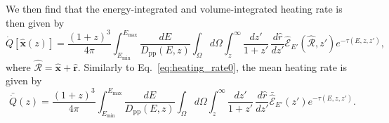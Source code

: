 \documentclass[numberedappendix]{emulateapj}
\begin{document}
We then find that the energy-integrated and volume-integrated heating rate is then given by 
\begin{equation}
  \label{eq:int_exp_heat}
  \dot{Q}[\mathbf{\hat{x}}(z)]=\frac{(1+z)^3}{4\pi }\int_{E_{\mathrm{min}}}^{E_{\mathrm{max}}} \frac{dE}{D_{\mathrm{pp}}(E,z)}\int_{\Omega}d\Omega\int_z^{\infty} \frac{d z'}{1+z'}\,\frac{d\hat r}{dz'}\mathcal{\hat E}_{E'}(\mathbf{\hat{\mathcal{R}}}, z') e^{-\tau(E,z,z')},
\end{equation}
where $\mathbf{\hat{\mathcal{R}}} = \mathbf{\hat{x}} + \mathbf{\hat{r}}$. Similarly to Eq.~\eqref{eq:heating_rate0}, the mean heating rate is given by
\begin{equation}
\label{eq:mean_exp_heat}
\bar{\dot{Q}} (z)=\frac{(1+z)^3}{4\pi}\int_{E_{\mathrm{min}}}^{E_{\mathrm{max}}} \frac{dE}{D_{\mathrm{pp}}(E, z)}\int_{\Omega}d\Omega\int_z^{\infty} \frac{d z'}{1+z'}\, \frac{d\hat r}{dz'}\bar{\hat{\mathcal{E}}}_{E'}(z') e^{-\tau(E,z,z')}.
\end{equation}
\end{document}

